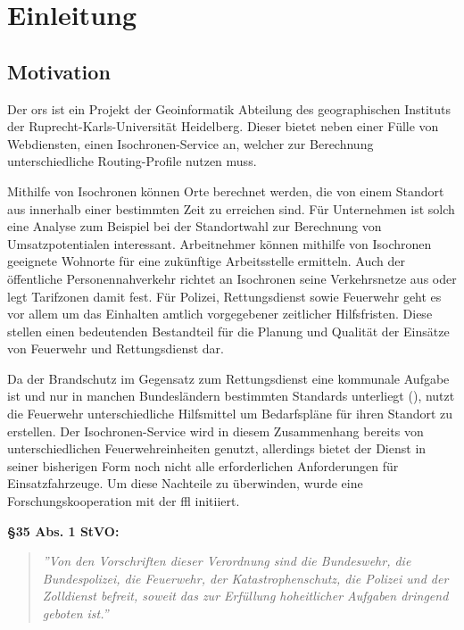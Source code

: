\section{Einleitung}

\subsection{Motivation}
Der \gls{ors} ist ein Projekt der Geoinformatik Abteilung des geographischen Instituts der Ruprecht-Karls-Universität Heidelberg.
Dieser bietet neben einer Fülle von Webdiensten, einen Isochronen-Service an, welcher zur Berechnung unterschiedliche Routing-Profile nutzen muss.\par
Mithilfe von Isochronen können Orte berechnet werden, die von einem Standort aus innerhalb einer bestimmten Zeit zu erreichen sind.
Für Unternehmen ist solch eine Analyse zum Beispiel bei der Standortwahl zur Berechnung von Umsatzpotentialen interessant.
Arbeitnehmer können mithilfe von Isochronen geeignete Wohnorte für eine zukünftige Arbeitsstelle ermitteln.
Auch der öffentliche Personennahverkehr richtet an Isochronen seine Verkehrsnetze aus oder legt Tarifzonen damit fest.
Für Polizei, Rettungsdienst sowie Feuerwehr geht es vor allem um das Einhalten amtlich vorgegebener zeitlicher Hilfsfristen.
Diese stellen einen bedeutenden Bestandteil für die Planung und Qualität der Einsätze von Feuerwehr und Rettungsdienst dar.\par
Da der Brandschutz im Gegensatz zum Rettungsdienst eine kommunale Aufgabe ist und nur in manchen Bundesländern bestimmten Standards unterliegt (\cite{bedarfsplan}), nutzt die Feuerwehr unterschiedliche Hilfsmittel um Bedarfspläne für ihren Standort zu erstellen.
Der Isochronen-Service wird in diesem Zusammenhang bereits von unterschiedlichen Feuerwehreinheiten genutzt, allerdings bietet der Dienst in seiner bisherigen Form noch nicht alle erforderlichen Anforderungen für Einsatzfahrzeuge.
Um diese Nachteile zu überwinden, wurde eine Forschungskooperation mit der \gls{ffl} initiiert.
\vspace{1.2cm}

\textbf{§35 Abs. 1 StVO:}
\begin{quotation}
\label{cit:STVO}
{\itshape\rmfamily ''Von den Vorschriften dieser Verordnung sind die Bundeswehr, die Bundespolizei, die Feuerwehr, der Katastrophenschutz, die Polizei und der Zolldienst befreit, soweit das zur Erfüllung hoheitlicher Aufgaben dringend geboten ist.''}
\end{quotation}

